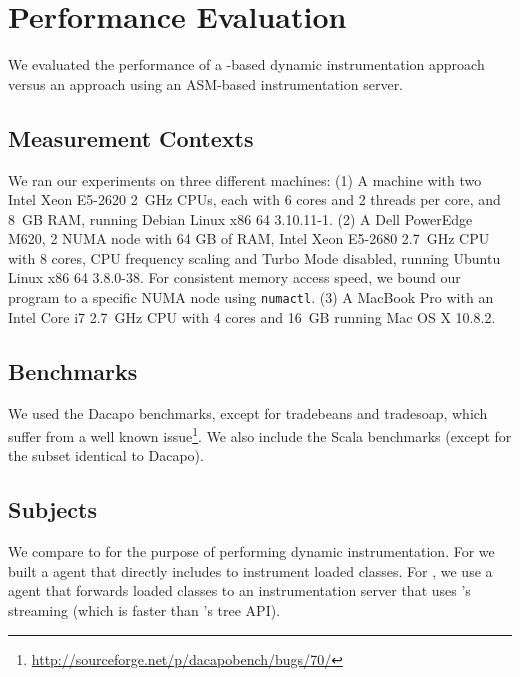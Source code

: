 \section{Performance Evaluation}\label{sec:jnif-evaluation}

We evaluated the performance of a \jnif{}-based dynamic instrumentation approach 
versus an approach using an ASM-based instrumentation server.

\subsection*{Measurement Contexts}

We ran our experiments on three different machines:
(1) A machine with two Intel Xeon E5-2620 2~GHz CPUs, 
each with 6 cores and 2 threads per core, 
and 8~GB RAM,
running Debian Linux x86 64 3.10.11-1.
(2) A Dell PowerEdge M620, 2 NUMA node with 64 GB of RAM, 
Intel Xeon E5-2680 2.7~GHz CPU
with 8 cores, 
CPU frequency scaling and Turbo Mode disabled,
running Ubuntu Linux x86 64 3.8.0-38.
For consistent memory access speed, 
we bound our program to a specific NUMA node using \texttt{numactl}.
(3) A MacBook Pro with an Intel Core i7 2.7~GHz CPU 
with 4 cores and 16~GB
running Mac OS X 10.8.2.

%




\subsection*{Benchmarks}

We used the Dacapo benchmarks, 
except for tradebeans and tradesoap,
which suffer from a well known issue\footnote{\url{http://sourceforge.net/p/dacapobench/bugs/70/}}.
We also include the Scala benchmarks (except for the subset identical to Dacapo).





\subsection*{Subjects}
We compare \jnif{} to \asm{} for the purpose of performing dynamic instrumentation.
For \jnif{} we built a \jvmti{} agent that directly includes \jnif{} to instrument loaded classes.
For \asm{}, we use a \jvmti{} agent that forwards loaded classes to an instrumentation server
that uses \asm{}'s streaming \api{} (which is faster than \asm{}'s tree API).


